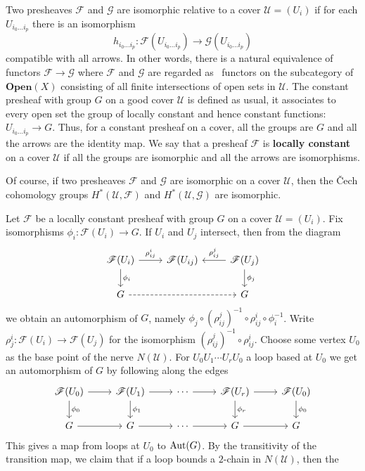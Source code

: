 Two presheaves $\mathscr{F}$ and $\mathscr{G}$ are isomorphic relative to a cover $\mathcal{U}=(U_i)$ if for each $U_{i_0\dots i_p}$ there is an isomorphism
\[h_{i_0\dots i_p}:\mathscr{F}(U_{i_0\dots i_p})\to\mathscr{G}(U_{i_0\dots i_p})\]
compatible with all arrows. In other words, there is a natural equivalence of functors $\mathscr{F}\to\mathscr{G}$ where $\mathscr{F}$ and $\mathscr{G}$ are regarded as \
functors on the subcategory of $\mathbf{Open}(X)$ consisting of all finite intersections of open sets in $\mathcal{U}$. The constant presheaf with group $G$ on a good 
cover $\mathcal{U}$ is defined as usual, it associates to every open set the group of locally constant and hence constant functions: $U_{i_0\dots i_p}\to G$. Thus, for 
a constant presheaf on a cover, all the groups are $G$ and all the arrows are the identity map. We say that a presheaf $\mathscr{F}$ is \textbf{locally constant} 
on a cover $\mathcal{U}$ if all the groups are isomorphic and all the arrows are isomorphisms.\par
Of course, if two presheaves $\mathscr{F}$ and $\mathscr{G}$ are isomorphic on a cover $\mathcal{U}$, then the \v{C}ech cohomology groups $H^*(\mathcal{U},\mathscr{F})$ 
and $H^*(\mathcal{U},\mathscr{G})$ are isomorphic.\par
Let $\mathscr{F}$ be a locally constant presheaf with group $G$ on a cover $\mathcal{U}=(U_i)$. Fix isomorphisms $\phi_i:\mathscr{F}(U_i)\to G$. If $U_i$ and $U_j$ 
intersect, then from the diagram
\[\begin{tikzcd}
\mathscr{F}(U_i)\ar[d,"\phi_i"]\ar[r,"\rho^i_{ij}"]&\mathscr{F}(U_{ij})&\mathscr{F}(U_j)\ar[l,swap,"\rho^j_{ij}"]\ar[d,"\phi_j"]\\
G\ar[rr,dashed]&&G
\end{tikzcd}\]
we obtain an automorphism of $G$, namely $\phi_j\circ(\rho_{ij}^j)^{-1}\circ\rho^i_{ij}\circ\phi_i^{-1}$. Write $\rho^i_j:\mathscr{F}(U_i)\to\mathscr{F}(U_j)$ for the 
isomorphism $(\rho_{ij}^j)^{-1}\circ\rho^i_{ij}$. Choose some vertex $U_0$ as the base point of the nerve $N(\mathcal{U})$. For $U_0U_1\cdots U_rU_0$ a loop based at 
$U_0$ we get an automorphism of $G$ by following along the edges
\[\begin{tikzcd}
\mathscr{F}(U_0)\ar[d,"\phi_0"]\ar[r]&\mathscr{F}(U_1)\ar[d,"\phi_1"]\ar[r]&\cdots\ar[r]&\mathscr{F}(U_r)\ar[d,"\phi_r"]\ar[r]&\mathscr{F}(U_0)\ar[d,"\phi_0"]\\
G\ar[r]&G\ar[r]&\cdots\ar[r]&G\ar[r]&G
\end{tikzcd}\]
This gives a map from loops at $U_0$ to $\mathrm{Aut}(G)$. By the transitivity of the transition map, we claim that if a loop bounds a $2$-chain in $N(\mathcal{U})$, then the 
